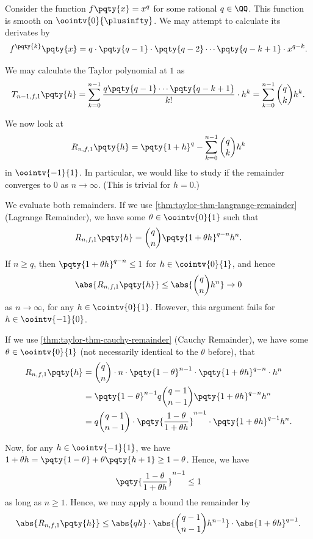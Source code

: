 \begin{example}
    \label{ex:application-taylor}%
    Consider the function \(f\pqty{x} = x^q\) for some rational \(q \in \QQ\). This function is smooth on \(\oointv{0}{\plusinfty}\). We may attempt to calculate its derivates by
    \[
        f^{\pqty{k}} \pqty{x} = q \cdot \pqty{q - 1} \cdot \pqty{q - 2} \cdots \pqty{q - k + 1} \cdot x^{q - k}.
    \]

    We may calculate the Taylor polynomial at \(1\) as
    \[
        T_{n - 1, f, 1} \pqty{h} = \sum_{k = 0}^{n - 1} \frac{q \pqty{q - 1} \cdots \pqty{q - k + 1}}{k!} \cdot h^k = \sum_{k = 0}^{n - 1} \binom{q}{k} h^k.
    \]

    We now look at
    \[
        R_{n, f, 1} \pqty{h} = \pqty{1 + h}^{q} - \sum_{k = 0}^{n - 1} \binom{q}{k} h^k
    \]
    in \(\oointv{-1}{1}\). In particular, we would like to study if the remainder converges to \(0\) as \(n \to \infty\). (This is trivial for \(h = 0\).)

    We evaluate both remainders. If we use \autoref{thm:taylor-thm-langrange-remainder} (Lagrange Remainder), we have some \(\theta \in \oointv{0}{1}\) such that
    \[
        R_{n, f, 1} \pqty{h} = \binom{q}{n} \pqty{1 + \theta h}^{q - n} h^n.
    \]

    If \(n \geq q\), then \(\pqty{1 + \theta h}^{q - n} \leq 1\) for \(h \in \cointv{0}{1}\), and hence
    \[
        \abs{R_{n, f, 1} \pqty{h}} \leq \abs{\binom{q}{n} h^n} \to 0
    \]
    as \(n \to \infty\), for any \(h \in \cointv{0}{1}\). However, this argument fails for \(h \in \oointv{-1}{0}\).

    If we use \autoref{thm:taylor-thm-cauchy-remainder} (Cauchy Remainder), we have some \(\theta \in \oointv{0}{1}\) (not necessarily identical to the \(\theta\) before), that
    \begin{align*}
        R_{n, f, 1} \pqty{h} &= \binom{q}{n} \cdot n \cdot \pqty{1 - \theta}^{n - 1} \cdot \pqty{1 + \theta h}^{q - n} \cdot h^n \\
        &= \pqty{1 - \theta}^{n - 1} q \binom{q - 1}{n - 1} \pqty{1 + \theta h}^{q - n} h^n \\
        &= q \binom{q - 1}{n - 1} \cdot \pqty{\frac{1 - \theta}{1 + \theta h}}^{n - 1} \cdot \pqty{1 + \theta h}^{q - 1} h^n.
    \end{align*}

    Now, for any \(h \in \oointv{-1}{1}\), we have \(1 + \theta h = \pqty{1 - \theta} + \theta \pqty{h + 1} \geq 1 - \theta\). Hence, we have
    \[
        \pqty{\frac{1 - \theta}{1 + \theta h}}^{n - 1} \leq 1
    \]
    as long as \(n \geq 1\). Hence, we may apply a bound the remainder by
    \[
        \abs{R_{n, f, 1} \pqty{h}} \leq \abs{qh} \cdot \abs{\binom{q - 1}{n - 1} h^{n - 1}} \cdot \abs{1 + \theta h}^{q - 1}.
    \]


\end{example}
